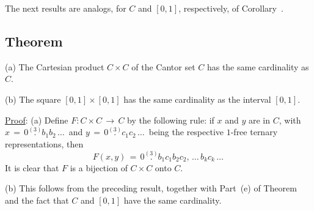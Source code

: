{\V
\V

        The next results are analogs, for $C$ and $[0,1]$, respectively, of Corollary~.

\V
\V


            \subsection{\small{\bf Theorem}}
            \label{ThmA20.140}

\hspace*{\parindent}
    (a) The Cartesian product $C{\times}C$ of the Cantor set $C$ has the same cardinality as $C$.

\V

        (b) The square $[0,1]{\times}[0,1]$ has the same cardinality as the interval $[0,1]$.

\V

        \underline{Proof}: (a) Define $F:C{\times}C \,{\rightarrow}\, C$ by the following rule:
    if $x$ and $y$ are in $C$, with $x \,=\, 0\stackrel{(3)}{.}b_{1}b_{2}\,{\ldots}\,$ and $y \,=\, 0\stackrel{(3)}{.}c_{1}c_{2}\,{\ldots}\,$ being the respective $1$-free ternary representations,
    then
        \begin{displaymath}
        F(x,y) \,=\, 0\stackrel{(3)}{.}b_{1}c_{1}b_{2}c_{2},\,{\ldots}\,b_{k}c_{k}\,{\ldots}\,
        \end{displaymath}
    It is clear that $F$ is a bijection of $C{\times}C$ onto $C$.

\V

        (b) This follows from the preceding result, together with Part~(e) of Theorem~ and the fact that $C$ and $[0,1]$ have the same cardinality.

\V
\V
}%

